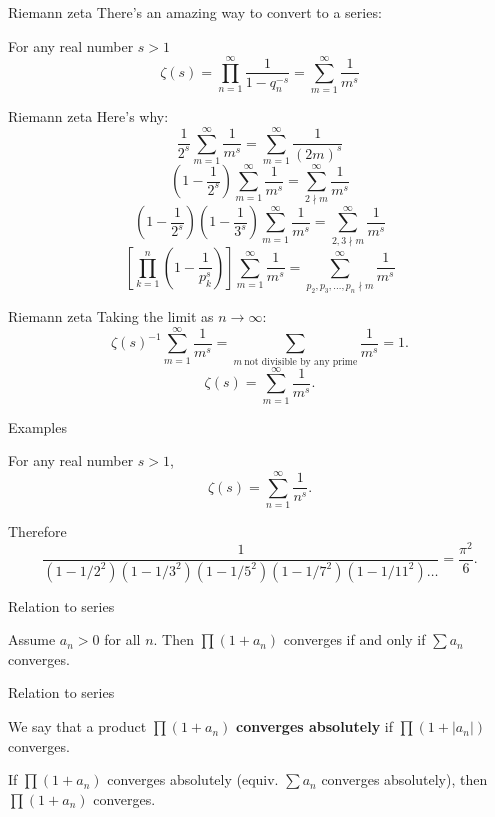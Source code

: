 \documentclass{beamer}
\begin{document}
\begin{frame}{Riemann zeta}
There's an amazing way to convert to a series:
\begin{thm}
For any real number $s>1$
$$\zeta(s) = \prod_{n=1}^\infty \frac{1}{1-q_n^{-s}} = \sum_{m=1}^{\infty}\frac{1}{m^s}$$
\end{thm}
\end{frame}
\begin{frame}{Riemann zeta}
Here's why:
$$\frac{1}{2^s} \sum_{m=1}^{\infty}\frac{1}{m^s} = \sum_{m=1}^\infty \frac{1}{(2m)^s}$$
$$\left(1-\frac{1}{2^s}\right) \sum_{m=1}^{\infty}\frac{1}{m^s} = \sum_{2\nmid m}^\infty \frac{1}{m^s}$$
$$\left(1-\frac{1}{2^s}\right)\left(1-\frac{1}{3^s}\right)  \sum_{m=1}^{\infty}\frac{1}{m^s} = \sum_{2,3\nmid m}^\infty \frac{1}{m^s}$$
$$\left[\prod_{k=1}^n\left(1-\frac{1}{p_k^s}\right)\right] \sum_{m=1}^{\infty}\frac{1}{m^s} = \sum_{p_2,p_3,\dots, p_n\nmid m}^\infty \frac{1}{m^s}$$
\end{frame}
\begin{frame}{Riemann zeta}
Taking the limit as $n\rightarrow\infty$:
$$\zeta(s)^{-1}\sum_{m=1}^\infty \frac{1}{m^s} = \sum_{m\ \text{not divisible by any prime}} \frac{1}{m^s} = 1.$$
$$\zeta(s) = \sum_{m=1}^\infty \frac{1}{m^s}.$$
\end{frame}

\begin{frame}{Examples}
\begin{thm}
For any real number $s>1$,
$$\zeta(s) = \sum_{n=1}^\infty \frac{1}{n^s}.$$
\end{thm}
Therefore
$$\frac{1}{(1-1/2^2)(1-1/3^2)(1-1/5^2)(1-1/7^2)(1-1/11^2)\dots} = \frac{\pi^2}{6}.$$
\end{frame}

\begin{frame}{Relation to series}
\begin{thm}
Assume $a_n > 0$ for all $n$.
Then $\prod (1+a_n)$ converges if and only if $\sum a_n$ converges.
\end{thm}
\end{frame}

\begin{frame}{Relation to series}
\begin{defn}
We say that a product $\prod (1+a_n)$ \textbf{converges absolutely} if $\prod (1+|a_n|)$ converges.
\end{defn}
\begin{thm}
If $\prod (1+a_n)$ converges absolutely (equiv. $\sum a_n$ converges absolutely), then $\prod (1+a_n)$ converges.
\end{thm}
\end{frame}
\end{document}
